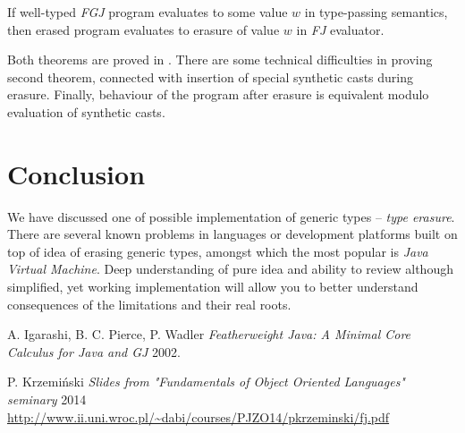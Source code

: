 \documentclass{article}[12pt]
\begin{document}
\begin{theorem}
If well-typed \emph{FGJ} program evaluates to some value $w$
in type-passing semantics, then erased program evaluates to
erasure of value $w$ in \emph{FJ} evaluator.
\end{theorem}

Both theorems are proved in \cite{fj}. There are some technical
difficulties in proving second theorem, connected with insertion
of special synthetic casts during erasure. Finally, behaviour of
the program after erasure is equivalent modulo evaluation of
synthetic casts.

\section{Conclusion}

We have discussed one of possible implementation of generic
types -- \emph{type erasure}. There are several known problems
in languages or development platforms built on top of idea
of erasing generic types, amongst which the most popular is
\emph{Java Virtual Machine}. Deep understanding of pure idea and
ability to review although simplified, yet working implementation
will allow you to better understand consequences of the limitations
and their real roots. 

\begin{thebibliography}{1}

   A. Igarashi, B. C. Pierce, P. Wadler
  {\em Featherweight Java: A Minimal Core Calculus for Java and GJ}
  2002.

   P. Krzemiński {\em Slides from "Fundamentals of
  Object Oriented Languages" seminary} 2014 \\
  \url{http://www.ii.uni.wroc.pl/~dabi/courses/PJZO14/pkrzeminski/fj.pdf}


\end{thebibliography}
\end{document}
